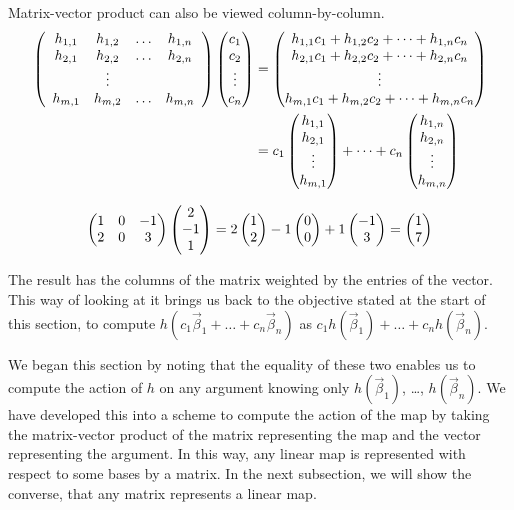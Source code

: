 Matrix-vector product can also be viewed column-by-column.
\begin{align*}
           \left( \begin{array}{cccc} h_{1,1} &h_{1,2} &\ldots &h_{1,n} \\ h_{2,1} &h_{2,2} &\ldots &h_{2,n} \\ &\vdots \\ h_{m,1} &h_{m,2} &\ldots &h_{m,n} \end{array} \right)
           \begin{pmatrix} c_1 \\ c_2 \\ \vdots \\ c_n \end{pmatrix}
  &=\begin{pmatrix} h_{1,1}c_1+h_{1,2}c_2+\dots+h_{1,n}c_n \\
               h_{2,1}c_1+h_{2,2}c_2+\dots+h_{2,n}c_n \\
               \vdots \\
               h_{m,1}c_1+h_{m,2}c_2+\dots+h_{m,n}c_n \end{pmatrix}    \\
  &=c_1\begin{pmatrix} h_{1,1} \\ h_{2,1} \\ \vdots \\ h_{m,1} \end{pmatrix}
   +\dots
   +c_n\begin{pmatrix} h_{1,n} \\ h_{2,n} \\ \vdots \\ h_{m,n} \end{pmatrix}
\end{align*}

\begin{example}
\begin{equation*}
    \begin{pmatrix}
      1  &0  &-1  \\
      2  &0  &3
    \end{pmatrix}
  \begin{pmatrix} 2 \\ -1 \\ 1 \end{pmatrix}
  =
  2\begin{pmatrix} 1 \\ 2 \end{pmatrix}
  -1\begin{pmatrix} 0 \\ 0 \end{pmatrix}
  +1\begin{pmatrix} -1 \\ 3 \end{pmatrix}
  =
  \begin{pmatrix} 1 \\ 7 \end{pmatrix}
\end{equation*}
\end{example}

The result has the
columns of the matrix weighted by the entries of the vector.
This way of looking at it
brings us back to the objective stated at the start of this section, to compute
\( h(c_1\vec{\beta}_1+\dots+c_n\vec{\beta}_n) \)
as
\( c_1h(\vec{\beta}_1)+\dots+c_nh(\vec{\beta}_n) \).

We began this section
by noting that the equality of these two enables us to compute the action 
of $h$ on any
argument knowing only $h(\vec{\beta}_1)$, \ldots, $h(\vec{\beta}_n)$.
We have developed this into a scheme to
compute the action of the map by taking 
the matrix-vector product of the matrix representing the 
map and the vector representing the argument.
In this way, any linear map is represented with respect to some bases
by a matrix.
In the next subsection, we will show the converse, that any matrix represents
a linear map.


